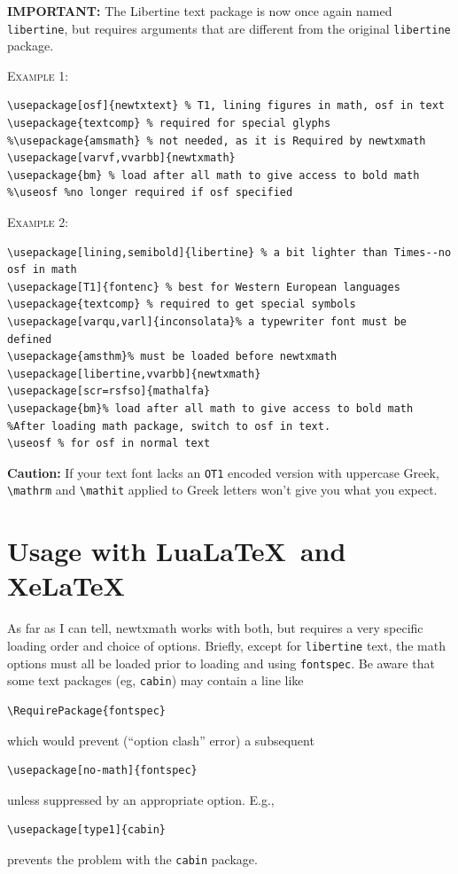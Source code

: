 \documentclass[11pt]{article}
\theoremstyle{oldplain}
\theoremstyle{plain}
\begin{document}
\textbf{IMPORTANT:} The Libertine text package is now once again named {\tt libertine}, but requires arguments that are different from the original {\tt libertine} package.

\textsc{Example 1:}
\begin{verbatim}
\usepackage[osf]{newtxtext} % T1, lining figures in math, osf in text
\usepackage{textcomp} % required for special glyphs
%\usepackage{amsmath} % not needed, as it is Required by newtxmath
\usepackage[varvf,vvarbb]{newtxmath}
\usepackage{bm} % load after all math to give access to bold math
%\useosf %no longer required if osf specified
\end{verbatim}
\textsc{Example 2:}
\begin{verbatim}
\usepackage[lining,semibold]{libertine} % a bit lighter than Times--no osf in math
\usepackage[T1]{fontenc} % best for Western European languages
\usepackage{textcomp} % required to get special symbols
\usepackage[varqu,varl]{inconsolata}% a typewriter font must be defined
\usepackage{amsthm}% must be loaded before newtxmath
\usepackage[libertine,vvarbb]{newtxmath}
\usepackage[scr=rsfso]{mathalfa}
\usepackage{bm}% load after all math to give access to bold math
%After loading math package, switch to osf in text.
\useosf % for osf in normal text
\end{verbatim}

\textbf{Caution:} If your text font lacks an {\tt OT1} encoded version with uppercase Greek, \verb|\mathrm| and \verb|\mathit| applied to Greek letters won't give you what you expect.
\section{Usage with Lua\LaTeX\ and Xe\LaTeX}
As far as I can tell, \textsf{newtxmath} works with both, but requires a very specific loading order and choice of options. Briefly, except for {\tt libertine} text, the math options must all be loaded prior to loading and using {\tt fontspec}. Be aware that some text packages (eg, {\tt cabin}) may contain a line like
\begin{verbatim}
\RequirePackage{fontspec}
\end{verbatim}
which would prevent (``option clash'' error) a subsequent 
\begin{verbatim}
\usepackage[no-math]{fontspec}
\end{verbatim}
unless suppressed by an appropriate option. E.g., 
\begin{verbatim}
\usepackage[type1]{cabin}
\end{verbatim}
prevents the problem with the {\tt cabin} package.
\end{document}
